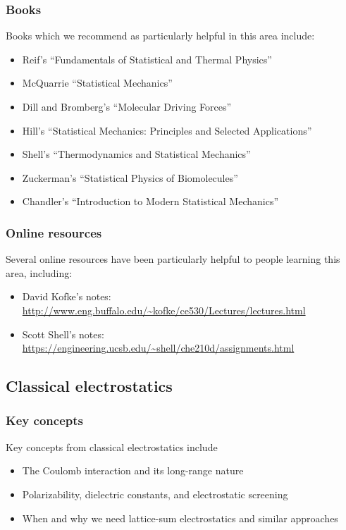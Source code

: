 \documentclass[9pt,bestpractices]{livecoms}
\begin{document}
\subsubsection{Books}

Books which we recommend as particularly helpful in this area include:
\begin{itemize}
\item Reif's ``Fundamentals of Statistical and Thermal Physics''~\cite{Reif:2009:}
\item McQuarrie ``Statistical Mechanics''~\cite{McQuarrie:2000:}
\item Dill and Bromberg's ``Molecular Driving Forces''~\cite{DillBook}
\item Hill's ``Statistical Mechanics: Principles and Selected Applications''~\cite{Hill:1987:}
\item Shell's ``Thermodynamics and Statistical Mechanics''~\cite{ShellBook}
\item Zuckerman's ``Statistical Physics of Biomolecules''~\cite{Zuckerman:2010:}
\item Chandler's ``Introduction to Modern Statistical Mechanics''~\cite{Chandler:1987:}
\end{itemize}

\subsubsection{Online resources}

Several online resources have been particularly helpful to people learning this area, including:
\begin{itemize}
\item David Kofke's notes: \url{http://www.eng.buffalo.edu/~kofke/ce530/Lectures/lectures.html}
\item Scott Shell's notes: \url{https://engineering.ucsb.edu/~shell/che210d/assignments.html}
\end{itemize}

\subsection{Classical electrostatics}
\label{sec:classical_electrostatics}
\subsubsection{Key concepts}
Key concepts from classical electrostatics include
\begin{itemize}
\item The Coulomb interaction and its long-range nature
\item Polarizability, dielectric constants, and electrostatic screening
\item When and why we need lattice-sum electrostatics and similar approaches
\end{itemize}
\end{document}
